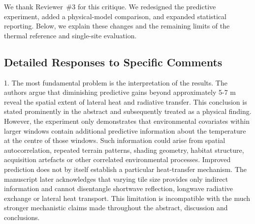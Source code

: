 \documentclass[12pt,english]{reviewresponse}
\begin{document}
\begin{revresponse}
We thank Reviewer~\#3 for this critique. We redesigned the predictive experiment, added a physical-model comparison, and expanded statistical reporting. Below, we explain these changes and the remaining limits of the thermal reference and single-site evaluation.
\end{revresponse}

\subsection*{Detailed Responses to Specific Comments}

\begin{revcomment}[adjusted title={Comment 1 (Part 1)}]
1. The most fundamental problem is the interpretation of the results. The authors argue that diminishing predictive gains beyond approximately 5-7 m reveal the spatial extent of lateral heat and radiative transfer. This conclusion is stated prominently in the abstract and subsequently treated as a physical finding. However, the experiment only demonstrates that environmental covariates within larger windows contain additional predictive information about the temperature at the centre of those windows. Such information could arise from spatial autocorrelation, repeated terrain patterns, shading geometry, habitat structure, acquisition artefacts or other correlated environmental processes. Improved prediction does not by itself establish a particular heat-transfer mechanism. The manuscript later acknowledges that varying tile size provides only indirect information and cannot disentangle shortwave reflection, longwave radiative exchange or lateral heat transport. This limitation is incompatible with the much stronger mechanistic claims made throughout the abstract, discussion and conclusions.
\end{revcomment}
\end{document}
